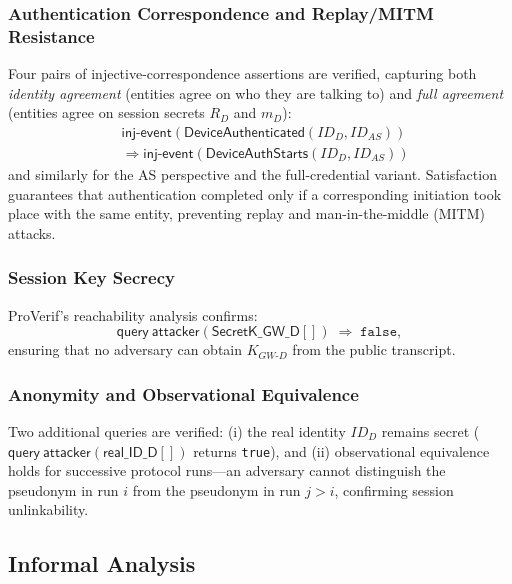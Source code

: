 \documentclass[conference]{IEEEtran}
\begin{document}
\subsubsection{Authentication Correspondence and Replay/MITM Resistance}

Four pairs of injective-correspondence assertions are verified, capturing
both \emph{identity agreement} (entities agree on who they are talking to)
and \emph{full agreement} (entities agree on session secrets $R_D$ and
$m_D$):
\begin{align*}
  &\mathsf{inj\text{-}event}(\mathsf{DeviceAuthenticated}(ID_D, ID_{AS}))\\
  &\Rightarrow\mathsf{inj\text{-}event}(\mathsf{DeviceAuthStarts}(ID_D, ID_{AS}))
\end{align*}
and similarly for the AS perspective and the full-credential variant.
Satisfaction guarantees that authentication completed only if a corresponding
initiation took place with the same entity, preventing replay and man-in-the-middle
(MITM) attacks.

\subsubsection{Session Key Secrecy}

ProVerif's reachability analysis confirms:
\begin{equation*}
  \mathsf{query}\ \mathsf{attacker}(\mathsf{SecretK\_GW\_D}[]) \;\Rightarrow\; \mathtt{false},
\end{equation*}
ensuring that no adversary can obtain $K_{GW\text{-}D}$ from the public
transcript.

\subsubsection{Anonymity and Observational Equivalence}

Two additional queries are verified:
(i) the real identity $ID_D$ remains secret ($\mathsf{query}\ \mathsf{attacker}(\mathsf{real\_ID\_D}[])$
returns \texttt{true}), and
(ii) observational equivalence holds for successive protocol runs—an adversary
cannot distinguish the pseudonym in run $i$ from the pseudonym in run $j > i$,
confirming session unlinkability.

\subsection{Informal Analysis}
\end{document}
